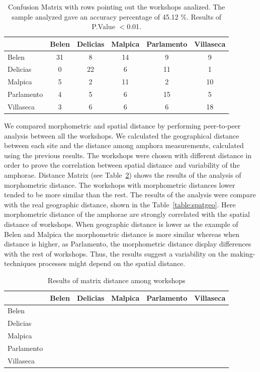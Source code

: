 \documentclass[review]{elsarticle}
\begin{document}
\begin{table}[htp]
\begin{tabular}{lccccc}
\hline
 & Belen & Delicias & Malpica & Parlamento & Villaseca\\ \hline
Belen & 31 &       8 &      14 &          9 &          9 \\
Delicias       & 0 &        22 &       6&         11&         1 \\
Malpica &       5  &     2  &    11   &       2  &      10 \\
Parlamento &     4  &      5 &      6 &        15 &        5\\
Villaseca   &   3   &     6   &    6  &        6  &     18 \\
\hline

\end{tabular}
\caption{Confusion Matrix with rows pointing out the workshops analized. The sample analyzed gave an accuracy percentage of 45.12 $\%$. Results of P.Value $<$0.01. }
\label{table:confusion}
\end{table}


We compared morphometric and spatial distance by performing peer-to-peer analysis between all the workshops. We calculated the geographical distance between each site and the distance among amphora measurements, calculated using the previous results. The workshops were chosen with different distance in order to prove the correlation between spatial distance and variability of the amphorae. Distance Matrix (see Table~\ref{table:spatialdistance}) shows the results of the analysis of morphometric distance. The workshops with morphometric distances lower tended to be more similar than the rest. The results of the analysis were compare with the real geographic distance, shown in the Table~\ref{table:spatgeo}. Here morphometric distance of the amphorae are strongly correlated with the spatial distance of workshops. When geographic distance is lower as the example of Belen and Malpica the morphometric distance is more similar whereas when distance is higher, as Parlamento, the morphometric distance display differences with the rest of workshops. Thus, the results suggest a variability on the making-techniques processes might depend on the spatial distance.  


\begin{table}[htp]
\begin{tabular}{lccccc}
\hline
 & Belen & Delicias & Malpica & Parlamento & Villaseca\\ \hline
Belen &  &        &         &           &           \\
Delicias       &   &        &       &         &          \\
Malpica &          &        &          &         &       \\
Parlamento &        &         &       &         &        \\
Villaseca   &       &        &      &          &      \\
\hline

\end{tabular}
\caption{Results of matrix distance among workshops}
\label{table:spatialdistance}
\end{table}
\end{document}
